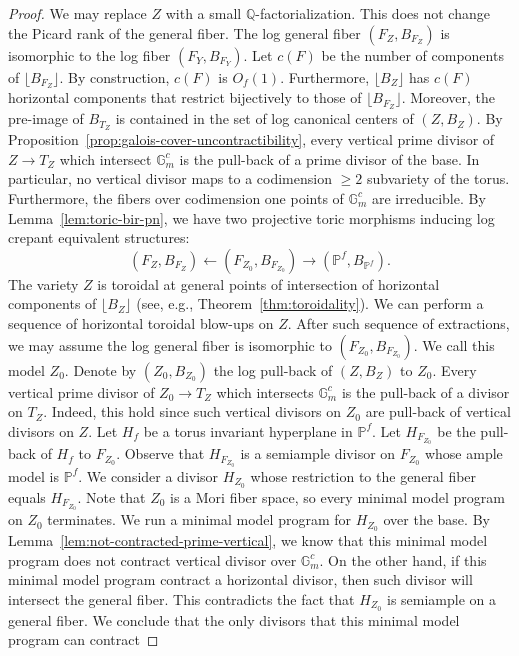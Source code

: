 \documentclass{amsart}
\newcommand{\pp}{\mathbb{P}}
\renewcommand{\qq}{\mathbb{Q}}
\theoremstyle{remark}
\numberwithin{equation}{section}
\begin{document}
\begin{proof}
We may replace $Z$ with a small $\qq$-factorialization.
This does not change the Picard rank of the general fiber.
The log general fiber $(F_Z,B_{F_Z})$ is isomorphic to the log fiber
$(F_Y,B_{F_Y})$.
Let $c(F)$ be the number of components of $\lfloor B_{F_Z}\rfloor$.
By construction, $c(F)$ is $O_f(1)$.
Furthermore, $\lfloor B_Z\rfloor$ has $c(F)$ horizontal components
that restrict bijectively to those of $\lfloor B_{F_Z}\rfloor$.
Moreover, the pre-image of $B_{T_Z}$ is contained in
the set of log canonical centers of $(Z,B_Z)$. 
By Proposition~\ref{prop:galois-cover-uncontractibility}, 
every vertical prime divisor of $Z\rightarrow T_Z$
which intersect $\mathbb{G}_m^c$ 
is the pull-back of a prime divisor of the base.
In particular, no vertical divisor maps to a codimension $\geq 2$ subvariety of the torus. Furthermore, the fibers over codimension one points of $\mathbb{G}_m^c$ are irreducible.
By Lemma~\ref{lem:toric-bir-pn}, we have two projective toric morphisms
inducing log crepant equivalent  structures:
\[
(F_Z,B_{F_Z})\leftarrow (F_{Z_0},B_{F_{Z_0}})\rightarrow 
(\pp^f,B_{\pp^f}).
\]
The variety $Z$ is toroidal
at general points of intersection
of horizontal components of $\lfloor B_Z\rfloor$ 
(see, e.g., Theorem~\ref{thm:toroidality}).
We can perform a sequence of horizontal toroidal blow-ups on $Z$.
After such sequence of extractions, 
we may assume the log general fiber is isomorphic to $(F_{Z_0},B_{F_{Z_0}})$.
We call this model $Z_0$.
Denote by $(Z_0,B_{Z_0})$ the log pull-back of $(Z,B_Z)$ to $Z_0$.
Every vertical prime divisor of $Z_0\rightarrow T_Z$
which intersects $\mathbb{G}_m^c$ 
is the pull-back of a divisor on $T_Z$.
Indeed, this hold since such vertical divisors on $Z_0$
are pull-back of vertical divisors on $Z$.
Let $H_f$ be a torus invariant hyperplane in $\pp^f$.
Let $H_{F_{Z_0}}$ be the pull-back of $H_f$ to $F_{Z_0}$.
Observe that $H_{F_{Z_0}}$ is a semiample divisor on $F_{Z_0}$
whose ample model is $\pp^f$.
We consider a divisor $H_{Z_0}$ whose restriction to the general fiber equals $H_{F_{Z_0}}$.
Note that $Z_0$ is a Mori fiber space, so every minimal model program on $Z_0$ terminates.
We run a minimal model program for $H_{Z_0}$ over the base.
By Lemma~\ref{lem:not-contracted-prime-vertical}, we know that this minimal model program does not contract vertical divisor over $\mathbb{G}_m^c$.
On the other hand, if this minimal model program contract a horizontal divisor,
then such divisor will intersect the general fiber.
This contradicts the fact that $H_{Z_0}$ is semiample on a general fiber.
We conclude that the only divisors that this minimal model program can contract

\end{proof}
\end{document}
